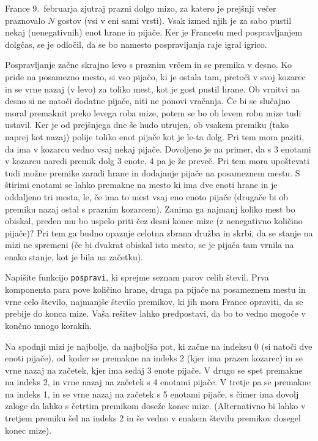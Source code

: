 \documentclass[arhiv]{../izpit}
\begin{document}
France 9.~februarja zjutraj prazni dolgo mizo, za katero je prejšnji večer praznovalo $N$ gostov (vsi v eni sami vrsti). Vsak izmed njih je za sabo pustil nekaj (nenegativnih) enot hrane in pijače. Ker je Francetu med pospravljanjem dolgčas, se je odločil, da se bo namesto pospravljanja raje igral igrico.

Pospravljanje začne skrajno levo s praznim vrčem in se premika v desno. Ko pride na posamezno mesto, si vso pijačo, ki je ostala tam, pretoči v svoj kozarec in se vrne nazaj (v levo) za toliko mest, kot je gost pustil hrane. Ob vrnitvi na desno si ne natoči dodatne pijače, niti ne ponovi vračanja. Če bi se slučajno moral premaknit preko levega roba mize, potem se bo ob levem robu mize tudi ustavil. Ker je od prejšnjega dne še hudo utrujen, ob vsakem premiku (tako naprej kot nazaj) polije toliko enot pijače kot je le-ta dolg. Pri tem mora paziti, da ima v kozarcu vedno vsaj nekaj pijače. Dovoljeno je na primer, da s 3 enotami v kozarcu naredi premik dolg 3 enote, 4 pa je že preveč. Pri tem mora upoštevati tudi možne premike zaradi hrane in dodajanje pijače na posameznem mestu. S štirimi enotami se lahko premakne na mesto ki ima dve enoti hrane in je oddaljeno tri mesta, le, če ima to mest vsaj eno enoto pijače (drugače bi ob premiku nazaj ostal s praznim kozarcem). Zanima ga najmanj koliko mest bo obiskal, preden mu bo uspelo priti čez desni konec mize (z nenegativno količino pijače)? Pri tem ga budno opazuje celotna zbrana družba in skrbi, da se stanje na mizi ne spremeni (če bi dvakrat obiskal isto mesto, se je pijača tam vrnila na enako stanje, kot je bila na začetku).

Napišite funkcijo \verb|pospravi|, ki sprejme seznam parov celih števil. Prva komponenta para pove količino hrane, druga pa pijače na posameznem mestu in vrne celo število, najmanjše število premikov, ki jih mora France opraviti, da se prebije do konca mize. Vaša rešitev lahko predpostavi, da bo to vedno mogoče v končno mnogo korakih.

Na spodnji mizi je najbolje, da najboljša pot, ki začne na indeksu 0 (si natoči dve enoti pijače), od koder se premakne na indeks 2 (kjer ima prazen kozarec) in se vrne nazaj na začetek, kjer ima sedaj 3 enote pijače. V drugo se spet premakne na indeks 2, in vrne nazaj na začetek s 4 enotami pijače. V tretje pa se premakne na indeks 1, in se vrne nazaj na začetek s 5 enotami pijače, s čimer ima dovolj zaloge da lahko s četrtim premikom doseže konec mize. (Alternativno bi lahko v tretjem premiku šel na indeks 2 in še vedno v enakem številu premikov dosegel konec mize).
\end{document}
